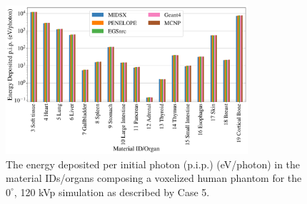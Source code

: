 
\begin{figure}[htbp]
    \centering
	\includegraphics[width=0.8\textwidth]{../figures/CT_120_0.pdf}
	\caption{The energy deposited per initial photon (p.i.p.) (eV/photon) in the material IDs/organs composing a voxelized human phantom for the $0^\circ$, 120 kVp simulation as described by Case 5.}
	\label{fig:CTGraph}
\end{figure}

\FloatBarrier
